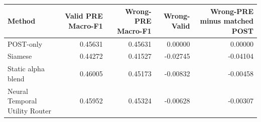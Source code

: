 \begin{tabular}{lrrrr}
\toprule
Method & Valid PRE Macro-F1 & Wrong-PRE Macro-F1 & Wrong-Valid & Wrong-PRE minus matched POST \\
\midrule
POST-only & 0.45631 & 0.45631 & 0.00000 & 0.00000 \\
Siamese & 0.44272 & 0.41527 & -0.02745 & -0.04104 \\
Static alpha blend & 0.46005 & 0.45173 & -0.00832 & -0.00458 \\
Neural Temporal Utility Router & 0.45952 & 0.45324 & -0.00628 & -0.00307 \\
\bottomrule
\end{tabular}
